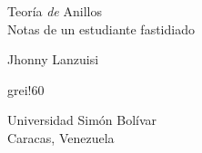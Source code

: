\thispagestyle{empty} 
\begin{titlepage}
	\sffamily\pagecolor{darkgrei}
	\vspace*{\baselineskip}
	
	
	\begin{center}
	{\fontsize{45}{12}\selectfont\color{wine2} Teoría\hspace{-3pt} \textit{\fontsize{40}{12}\selectfont de}\hspace{-6pt} Anillos}\\[\baselineskip] %
	{\textcolor{wine2!40}{\LARGE Notas de un estudiante fastidiado}} %
	\end{center}

	\vfill %

	\begin{flushright}
		{\huge\color{grei} Jhonny Lanzuisi}
	\end{flushright}
	\vspace{.15\paperheight}
	\begin{colorstrip}{grei!60}
	\begin{center}
	{\color{wine!90}\huge Universidad Simón Bolívar \\[.5em] Caracas, Venezuela}
	\end{center}
	\end{colorstrip}
	\vspace*{-13em}
\end{titlepage}